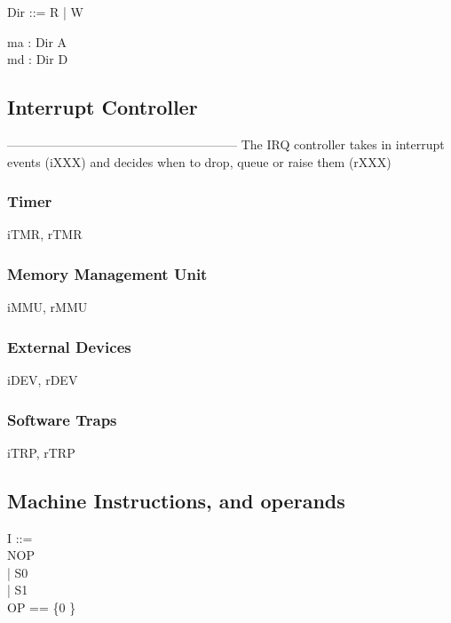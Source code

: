 \begin{circus}
Dir ::= R  %
        | W  %
\end{circus}

\begin{circus}
\circchannel ma : Dir \cross A\\  %
\circchannel md : Dir \cross D  %
\end{circus}


\subsection{Interrupt Controller} --------------------------------------------------------
The IRQ controller takes in interrupt events (iXXX)
and decides when to drop, queue or raise them (rXXX)


\subsubsection{Timer}

\begin{circus}
\circchannel iTMR, rTMR
\end{circus}

\subsubsection{Memory Management Unit}

\begin{circus}
\circchannel iMMU, rMMU
\end{circus}

\subsubsection{External Devices}

\begin{circus}
\circchannel iDEV, rDEV
\end{circus}

\subsubsection{Software Traps}
\begin{circus}
\circchannel iTRP, rTRP
\end{circus}

\subsection{Machine Instructions, and operands} %
\begin{circus}
I ::=\\
  NOP\\   %
  | S0\\    %
  | S1\\    %

OP == \{0 \}
\end{circus}

